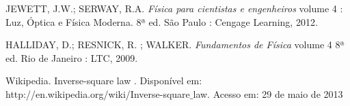 \documentclass[a4paper,11pt]{article}
\begin{document}
\begin{Gráfico}
	
\end{Gráfico}
\begin{thebibliography}{9}    
  		JEWETT, J.W.; SERWAY, R.A.
  		\emph{Física para cientistas e engenheiros} volume 4 : Luz, Óptica e Física Moderna.
 		 8ª ed.
 		 São Paulo : Cengage Learning, 2012.
 		 
  		HALLIDAY, D.; RESNICK, R. ; WALKER.
  		\emph{Fundamentos de Física} volume 4
 		 8ª ed.
 		 Rio de Janeiro : LTC, 2009.
 	
 			Wikipedia. Inverse-square law . Disponível em: http://en.wikipedia.org/wiki/Inverse-square$\_$law. Acesso em: 29 de maio de 2013

\end{thebibliography}
\end{document}
